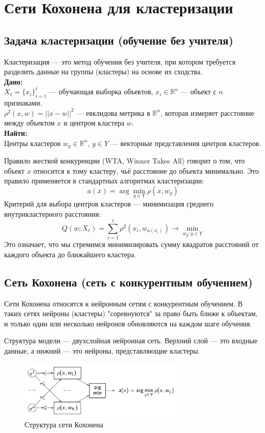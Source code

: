 \section{Сети Кохонена для кластеризации}

\subsection{Задача кластеризации (обучение без учителя)}
Кластеризация — это метод обучения без учителя, при котором требуется разделить данные на группы (кластеры) на основе их сходства.  \\
\textbf{Дано:}  \\
$X_\ell = \{ x_i \}_{i=1}^{\ell}$ — обучающая выборка объектов, $x_i \in \mathbb{R}^n$ — объект с $n$ признаками.\\
$\rho^2(x, w) = || x - w ||^2$ — евклидова метрика в $\mathbb{R}^n$, которая измеряет расстояние между объектом $x$ и центром кластера $w$.\\

\textbf{Найти:} \\
Центры кластеров $w_y \in \mathbb{R}^n$, $y \in Y$ — векторные представления центров кластеров.

Правило жесткой конкуренции (WTA, Winner Takes All) говорит о том, что объект $x$ относится к тому кластеру, чьё расстояние до объекта минимально. Это правило применяется в стандартных алгоритмах кластеризации:
\[
    a(x) = \arg \min_{y \in Y} \rho(x, w_y)
\]
Критерий для выбора центров кластеров — минимизация среднего внутрикластерного расстояния:
\[
    Q(w; X_\ell) = \sum_{i=1}^{\ell} \rho^2(x_i, w_{a(x_i)}) \to \min_{w_y : y \in Y}
\]
Это означает, что мы стремимся минимизировать сумму квадратов расстояний от каждого объекта до ближайшего кластера.

\subsection{Сеть Кохонена (сеть с конкурентным обучением)}
Сети Кохонена относятся к нейронным сетям с конкурентным обучением. В таких сетях нейроны (кластеры) "соревнуются" за право быть ближе к объектам, и только один или несколько нейронов обновляются на каждом шаге обучения.

Структура модели — двухслойная нейронная сеть. Верхний слой — это входные данные, а нижний — это нейроны, представляющие кластеры.

\begin{figure}[h]
    \centering
    \includegraphics[width=0.7\textwidth]{chapters/clustering/images/scheme_kohonen.jpg}
    \caption{Структура сети Кохонена}
\end{figure}

